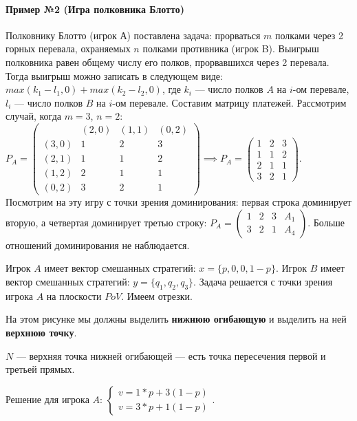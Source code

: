 \documentclass{article}
\begin{document}
\paragraph{Пример №2 (Игра полковника Блотто)} Полковнику Блотто (игрок А) поставлена задача: прорваться $m$ полками через 2 горных перевала, охраняемых $n$ полками противника (игрок B). Выигрыш полковника равен общему числу его полков, прорвавшихся через 2 перевала. Тогда выигрыш можно записать в следующем виде: $max (k_{1} - l_{1}, 0) + max(k_{2} - l_{2}, 0)$, где $k_{i}$ — число полков $A$ на $i$-ом перевале, $l_{i}$ — число полков $B$ на $i$-ом перевале. Составим матрицу платежей. Рассмотрим случай, когда $m = 3$, $n = 2$: $P_{A} = \begin{pmatrix}
    & (2, 0) & (1, 1) & (0, 2) \\
    (3, 0) & 1 & 2 & 3 \\
    (2, 1) & 1 & 1 & 2 \\
    (1, 2) & 2 & 1 & 1 \\
    (0, 2) & 3 & 2 & 1
\end{pmatrix} \implies P_{A} = \begin{pmatrix}
    1 & 2 & 3 \\
    1 & 1 & 2 \\
    2 & 1 & 1 \\
    3 & 2 & 1
\end{pmatrix}$. Посмотрим на эту игру с точки зрения доминирования: первая строка доминирует вторую, а четвертая доминирует третью строку: $P_{A} = \begin{pmatrix}
    1 & 2 & 3 & A_{1} \\
    3 & 2 & 1 & A_{4}
\end{pmatrix}$. Больше отношений доминирования не наблюдается.

Игрок $A$ имеет вектор смешанных стратегий: $x = \{ p, 0, 0, 1 - p \}$. Игрок $B$ имеет вектор смешанных стратегий: $y = \{ q_{1}, q_{2}, q_{3} \}$. Задача решается с точки зрения игрока $A$ на плоскости $PoV$. Имеем отрезки.

На этом рисунке мы должны выделить \textbf{нижнюю огибающую} и выделить на ней \textbf{верхнюю точку}.

$N$ — верхняя точка нижней огибающей — есть точка пересечения первой и третьей прямых.

Решение для игрока $A$: $\begin{cases}
    v = 1 * p + 3 (1 - p) \\
    v = 3 * p + 1 ( 1 - p)
\end{cases}$.
\end{document}
